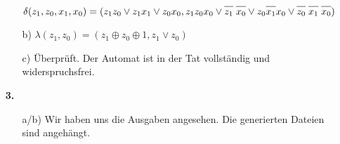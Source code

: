 \documentclass[a4paper,10pt]{scrartcl}
\newcommand*{\oline}[1]{\overline{\vphantom{A}#1}}
\begin{document}
\begin{enumerate}
\begin{enumerate}
                $\delta(z_1, z_0, x_1, x_0) = (z_1z_0 \vee z_1x_1 \vee z_0x_0, z_1z_0x_0 \vee \oline{z_1}\;\oline{x_0} \vee z_0\oline{x_1}x_0 \vee \oline{z_0}\;\oline{x_1}\;\oline{x_0})$

            \item[b)]
                $\lambda(z_1, z_0) = (z_1 \oplus z_0 \oplus 1, z_1 \vee z_0)$

            \item[c)]
                Überprüft. Der Automat ist in der Tat vollständig und widerspruchsfrei.

        \end{enumerate}
    \item[\textbf{3.}]
        \begin{enumerate}
            \item[a/b)] Wir haben uns die Ausgaben angesehen. Die generierten Dateien sind angehängt.
        \end{enumerate}
\end{enumerate}
\end{document}
